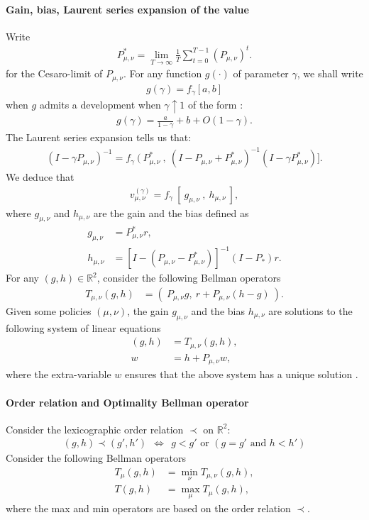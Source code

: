 \documentclass{article}
\def\R{\mathbb R}
\begin{document}
\paragraph{Gain, bias, Laurent series expansion of the value} 
Write
\begin{align}
P_{\mu,\nu}^* = \lim_{T \to \infty} \frac{1}{T}\sum_{t=0}^{T-1} (P_{\mu,\nu})^t. 
\end{align}
for the Cesaro-limit of $P_{\mu,\nu}$.
For any function $g(\cdot)$ of parameter $\gamma$, we shall write
\begin{align}
  g(\gamma)=f_\gamma [a,b]
\end{align}
when $g$ admits a development when $\gamma \uparrow 1$ of the form :
\begin{align}
  g(\gamma)=\frac{a}{1-\gamma}+b+O(1-\gamma).
\end{align}
The Laurent series expansion \cite[Appendix A]{puterman} tells us that: 
\begin{align}
(I-\gamma P_{\mu,\nu})^{-1} = f_\gamma ~(~ P^*_{\mu,\nu}~,~ (I- P_{\mu,\nu} + P^*_{\mu,\nu})^{-1} (I-\gamma P_{\mu,\nu}^*) ].
\end{align}
We deduce that
\begin{align}
  v^{(\gamma)}_{\mu,\nu} = f_\gamma ~[~ g_{\mu,\nu} ~,~ h_{\mu,\nu} ~],
\end{align}
where $g_{\mu,\nu}$ and $h_{\mu,\nu}$ are the gain and the bias defined as
\begin{align}
  g_{\mu,\nu} &= P_{\mu,\nu}^* r,\\
  h_{\mu,\nu} &= [ I-(P_{\mu,\nu}-P^*_{\mu,\nu})]^{-1} (I-P_*)r.
\end{align}
For any $(g,h) \in \R^2$, consider the following Bellman operators
\begin{align}
  T_{\mu,\nu} (g, h) & = (~ P_{\mu,\nu}g,~ r + P_{\mu,\nu}(h-g) ~).
\end{align}
Given some policies $(\mu,\nu)$, the gain $g_{\mu,\nu}$ and the bias $h_{\mu,\nu}$ are solutions to the following system of linear equations
\begin{align}
  (g,h)&=T_{\mu,\nu}(g,h), \\
  w &= h + P_{\mu,\nu} w,
\end{align}
where the extra-variable $w$ ensures that the above system has a unique solution \cite[Theorem 8.2.6 and Corollary 8.2.9]{puterman}.


\paragraph{Order relation and Optimality Bellman operator}
Consider the lexicographic order relation $\prec$ on $\R^2$:
\begin{align}
  (g,h) \prec (g',h') ~~\Leftrightarrow~~ g < g' \mbox{ or }(g=g' \mbox{ and }h < h')
\end{align}
Consider the following Bellman operators
\begin{align}
T_{\mu} (g,h) & = \min_\nu T_{\mu,\nu} (g,h),  \\
T (g,h) &= \max_\mu T_{\mu} (g,h),
\end{align}
where the max and min operators are based on the order relation $\prec$.
\end{document}
